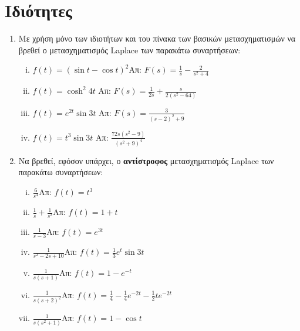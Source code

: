 


\geometry{left=15.63mm,right=15.63mm,top=32.25mm,bottom=36.25mm,footskip=24.16mm,headsep=24.16mm}

\everymath{\displaystyle}
\pagestyle{askhseis}



\begin{center}
  \minibox{\large\bf \textcolor{Col1}{Ασκήσεις στο Μετασχηματισμό Laplace}}
\end{center}


\section*{Ιδιότητες}

\begin{enumerate}
  \item Με χρήση μόνο των ιδιοτήτων και του πίνακα των βασικών μετασχηματισμών να βρεθεί 
    ο μετασχηματισμός Laplace των παρακάτω συναρτήσεων:
    \begin{enumerate}[i)]
      \item $f(t)=(\sin t-\cos t)^2$\hfill Απ: $F(s)=\frac{1}{s}-\frac{2}{s^2+4}$
      \item $f(t)=\cosh^2 4t$ \hfill Απ: $F(s)=\frac{1}{2s}+\frac{s}{2(s^2-64)}$
      \item $f(t)=e^{2t}\sin 3t$ \hfill Απ: $F(s)=\frac{3}{(s-2)^2+9}$
      \item $f(t)=t^3\sin 3t$ \hfill Απ: $\frac{72s(s^2-9)}{(s^2+9)^4}$
    \end{enumerate}

  \item Να βρεθεί, εφόσον υπάρχει, ο \textbf{αντίστροφος} μετασχηματισμός Laplace 
    των παρακάτω συναρτήσεων:
    \begin{enumerate}[i)]
      \item $\frac{6}{s^4}$\hfill Απ: $f(t)=t^3$
      \item $\frac{1}{s}+\frac{1}{s^2}$\hfill Απ: $f(t)=1+t$
      \item $\frac{1}{s-3}$\hfill Απ: $f(t)=e^{3t}$
      \item $\frac{1}{s^2-2s+10}$\hfill Απ: $f(t)=\frac{1}{3}e^t\sin 3t$
      \item $\frac{1}{s(s+1)}$\hfill Απ: $f(t)=1-e^{-t}$
      \item $\frac{1}{s(s+2)^2}$\hfill Απ: $f(t)=\frac{1}{4}-\frac{1}{4}e^{-2t}-
        \frac{1}{2}te^{-2t}$
      \item $\frac{1}{s(s^2+1)}$\hfill Απ: $f(t)=1-\cos t$
    \end{enumerate}
\end{enumerate}


